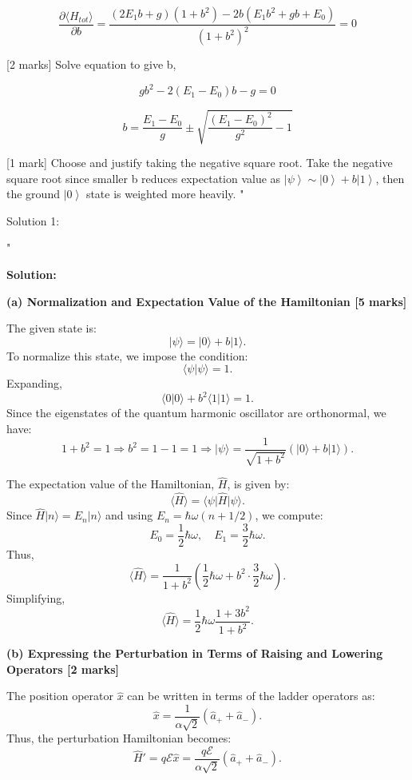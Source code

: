 \[ \frac{\partial \langle H_{tot} \rangle}{\partial b} = \frac{(2E_1 b + g)(1+b^2) - 2b(E_1 b^2 + gb + E_0)}{(1+b^2)^2} = 0 \]

[2 marks] Solve equation to give b, 

\[ gb^2 - 2(E_1 - E_0)b - g = 0 \]

\[ b = \frac{E_1 - E_0}{g} \pm \sqrt{\frac{(E_1-E_0)^2}{g^2}-1} \]

[1 mark] Choose and justify taking the negative square root. Take the negative square root since smaller b reduces expectation value as \(  \left| \psi \right> \sim \left| 0 \right> + b \left| 1 \right> \), then the ground \( \left| 0 \right> \) state is weighted more heavily. 
"

Solution 1: 

"

\noindent \textbf{Solution:}

\textbf{(a) Normalization and Expectation Value of the Hamiltonian [5 marks]}

The given state is:
\[
\vert \psi \rangle = \vert 0 \rangle + b \vert 1 \rangle.
\]
To normalize this state, we impose the condition:
\[
\langle \psi \vert \psi \rangle = 1.
\]
Expanding,
\[
\langle 0 \vert 0 \rangle + b^2 \langle 1 \vert 1 \rangle = 1.
\]
Since the eigenstates of the quantum harmonic oscillator are orthonormal, we have:
\[
1 + b^2 = 1 \Rightarrow b^2 = 1 - 1 = 1 \Rightarrow \vert \psi \rangle = \frac{1}{\sqrt{1 + b^2}} (\vert 0 \rangle + b \vert 1 \rangle).
\]

The expectation value of the Hamiltonian, \( \hat{H} \), is given by:
\[
\langle \hat{H} \rangle = \langle \psi \vert \hat{H} \vert \psi \rangle.
\]
Since \( \hat{H} \vert n \rangle = E_n \vert n \rangle \) and using \( E_n = \hbar \omega (n + 1/2) \), we compute:
\[
E_0 = \frac{1}{2} \hbar \omega, \quad E_1 = \frac{3}{2} \hbar \omega.
\]
Thus,
\[
\langle \hat{H} \rangle = \frac{1}{1 + b^2} \left( \frac{1}{2} \hbar \omega + b^2 \cdot \frac{3}{2} \hbar \omega \right).
\]
Simplifying,
\[
\langle \hat{H} \rangle = \frac{1}{2} \hbar \omega \frac{1 + 3b^2}{1 + b^2}.
\]

\textbf{(b) Expressing the Perturbation in Terms of Raising and Lowering Operators [2 marks]}

The position operator \( \hat{x} \) can be written in terms of the ladder operators as:
\[
\hat{x} = \frac{1}{\alpha \sqrt{2}} (\hat{a}_+ + \hat{a}_-).
\]
Thus, the perturbation Hamiltonian becomes:
\[
\hat{H}' = q\mathcal{E} \hat{x} = \frac{q\mathcal{E}}{\alpha \sqrt{2}} (\hat{a}_+ + \hat{a}_-).
\]

